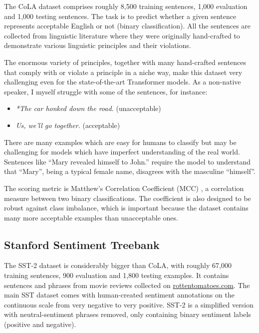 \documentclass[bsc,frontabs,twoside,singlespacing,parskip,deptreport]{infthesis}
\begin{document}
{{{      The CoLA dataset \citep{CoLA-paper} comprises roughly 8,500 training sentences, 1,000 evaluation and 1,000 testing sentences.
      The task is to predict whether a given sentence represents acceptable English or not (binary classification).
      All the sentences are collected from linguistic literature where they were originally hand-crafted to demonstrate various linguistic principles and their violations.
      
      The enormous variety of principles, together with many hand-crafted sentences that comply with or violate a principle in a niche way, make this dataset very challenging even for the state-of-the-art Transformer models. 
      As a non-native speaker, I myself struggle with some of the sentences, for instance:
      \begin{itemize}
        \item \textit{*The car honked down the road.} (unacceptable)
        \item \textit{Us, we'll go together.} (acceptable)
      \end{itemize}

      There are many examples which are easy for humans to classify but may be challenging for models which have imperfect understanding of the real world. Sentences like ``Mary revealed himself to John.'' require the model to understand that ``Mary'', being a typical female name, disagrees with the masculine ``himself''.
      
      The scoring metric is Matthew's Correlation Coefficient (MCC) \citep{Matthews_1975}, a correlation measure between two binary classifications. The coefficient is also designed to be robust against class imbalance, which is important because the dataset contains many more acceptable examples than unacceptable ones.
    }

    \subsection{Stanford Sentiment Treebank}{
      \label{sec:datasets-SST-2}

      The SST-2 dataset \citep{SST-paper} is considerably bigger than CoLA, with roughly 67,000 training sentences, 900 evaluation and 1,800 testing examples. It contains sentences and phrases from movie reviews collected on \url{rottentomatoes.com}. The main SST dataset comes with human-created sentiment annotations on the continuous scale from very negative to very positive. SST-2 is a simplified version with neutral-sentiment phrases removed, only containing binary sentiment labels (positive and negative).

}}}
\end{document}
